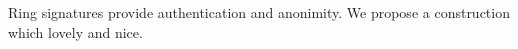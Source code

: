Ring signatures provide authentication and anonimity. We propose a construction which lovely and nice.
